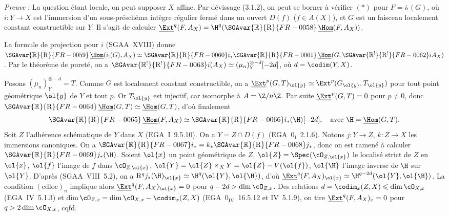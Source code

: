 \emph{Preuve} : La question étant locale, on peut supposer $X$ affine. Par dévissage (3.1.2), on peut se borner à vérifier $(*)$ pour $F = i_{!}(G)$, où $i : Y \to X$ est l'immersion d'un sous-préschéma intègre régulier fermé dans un ouvert $D(f)$ ($f \in A(X)$), et $G$ est un faisceau localement constant
constructible sur $Y$. Il s'agit de calculer $\underline{\Ext}^q(F, A_X) = \H^q(\SGAvar{\mathbb{R}}{\mathrm{R}}{FR-0058}\,\underline{\Hom}(F, A_X))$.

La formule de projection pour $i$ (SGAA~XVIII) donne $\SGAvar{\mathbb{R}}{\mathrm{R}}{FR-0059}\,\underline{\Hom}(i_{!}(G), A_X) \simeq \SGAvar{\mathbb{R}}{\mathrm{R}}{FR-0060} i_{*} \SGAvar{\mathbb{R}}{\mathrm{R}}{FR-0061}\,\underline{\Hom}(G, \SGAvar{\mathbb{R}^{!}}{\mathrm{R}^{!}}{FR-0062}iA_X)$. Par le théorème de pureté, on a $\SGAvar{\mathbb{R}^{!}}{\mathrm{R}^{!}}{FR-0063}i(A_X) \simeq (\mu_n)^{\otimes -d}_Y[-2d]$, où $d = \codim(Y,X)$.

Posons $(\mu_n)^{\otimes -d}_Y = T$. Comme $G$ est localement constant constructible, on a $\underline{\Ext}^p(G,T)_{\ol{y}} \simeq \Ext^p(G_{\ol{y}}, T_{\ol{y}})$ pour tout point géométrique $\ol{y}$ de $Y$ et tout $p$. Or $T_{\ol{y}}$ est injectif, car isomorphe à $A = \Z/n\Z$. Par suite $\underline{\Ext}^p(G,T) = 0$ pour $p \neq 0$, donc $\SGAvar{\mathbb{R}}{\mathrm{R}}{FR-0064}\,\underline{\Hom}(G,T) \simeq \underline{\Hom}(G,T)$, d'où finalement
\[
\SGAvar{\mathbb{R}}{\mathrm{R}}{FR-0065}\,\underline{\Hom}(F, A_X) \simeq \SGAvar{\mathbb{R}}{\mathrm{R}}{FR-0066} i_{*}(\H)[-2d], \quad \text{avec } \H = \underline{\Hom}(G,T).
\]
Soit $Z$ l'adhérence schématique de $Y$ dans $X$ (EGA~I~9.5.10). On a $Y = Z \cap D(f)$ (EGA~$0_{\mathrm{I}}$~2.1.6). Notons $j : Y \to Z$, $k : Z \to X$ les immersions canoniques. On a $\SGAvar{\mathbb{R}}{\mathrm{R}}{FR-0067} i_{*} = k_{*} \SGAvar{\mathbb{R}}{\mathrm{R}}{FR-0068} j_{*}$, donc on est ramené à calculer $\SGAvar{\mathbb{R}}{\mathrm{R}}{FR-0069} j_{*}(\H)$. Soient $\ol{x}$ un point géométrique de $Z$, $\ol{Z} = \Spec(\cO_{Z,\ol{x}})$ le localisé strict de $Z$ en $\ol{x}$, $\ol{f}$ l'image de $f$ dans $\cO_{Z,\ol{x}}$, $\ol{Y} = \ol{Z} \times_X Y = \ol{Z} - V(\ol{f})$, $\ol{\H}$ l'image inverse de $\H$ sur $\ol{Y}$. D'après (SGAA~VIII~5.2), on a $\mathrm{R}^q j_{*}(\H)_{\ol{x}} \simeq \H^q(\ol{Y}, \ol{\H})$, d'où $\underline{\Ext}^q(F, A_X)_{\ol{x}} \simeq \H^{q-2d}(\ol{Y}, \ol{\H})$. La condition $(\mathrm{cdloc})_n$ implique alors $\underline{\Ext}^q(F, A_X)_{\ol{x}} = 0$ pour $q - 2d > \dim \cO_{Z,x}$. Des relations $d = \codim_{x}(Z,X) \leqslant \dim \cO_{X,x}$ (EGA~IV~5.1.3) et $\dim \cO_{Z,x} = \dim \cO_{X,x} - \codim_{x}(Z,X)$ (EGA~$0_{\mathrm{IV}}$~16.5.12 et IV~5.1.9), on tire $\underline{\Ext}^q(F, A_X)_x = 0$ pour $q > 2\dim \cO_{X,x}$, cqfd.

